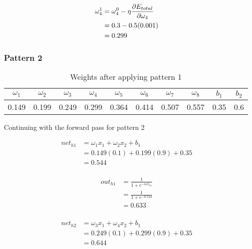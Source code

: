 \documentclass[10pt,a4paper]{article}
\begin{document}
\begin{equation}
\begin{split}
\omega_4^1 &= \omega_4^0 - \eta\pdv{E_{total}}{\omega_4}\\
           &= 0.3 -0.5(0.001)\\
           &= 0.299\\
\end{split}
\end{equation}

\subsubsection{Pattern 2}
\begin{table}
\begin{tabular}{|c|c|c|c|c|c|c|c|c|c|}
\hline
$\omega_1$ & $\omega_2$ & $\omega_3$ & $\omega_4$ & $\omega_5$ & $\omega_6$ & $\omega_7$ & $\omega_8$ & $b_1$ & $b_2$\\
\hline
0.149 &0.199 &0.249 & 0.299 & 0.364 & 0.414 & 0.507 & 0.557 & 0.35 & 0.6 \\
\hline
\end{tabular}
\caption{Weights after applying pattern 1}\label{tablep2}
\end{table}

Continuing with the forward pass for pattern 2

\begin{equation}
\begin{split}
net_{h1} &= \omega_1 x_1 + \omega_2 x_2 + b_1 \\
         &= 0.149(0.1) + 0.199(0.9) + 0.35 \\
         &= 0.544\\
\end{split}
\end{equation}

\begin{equation}
\begin{split}
out_{h1} &= \frac{1}{1+e^{-net_{h1}}}\\ 
         &= \frac{1}{1+e^{-0.544}}\\ 
         &= 0.633\\
\end{split}
\end{equation}

\begin{equation}
\begin{split}
net_{h2} &= \omega_3 x_1 + \omega_4 x_2 + b_1 \\
         &= 0.249(0.1) + 0.299(0.9) + 0.35 \\
         &= 0.644\\
\end{split}
\end{equation}
\end{document}
